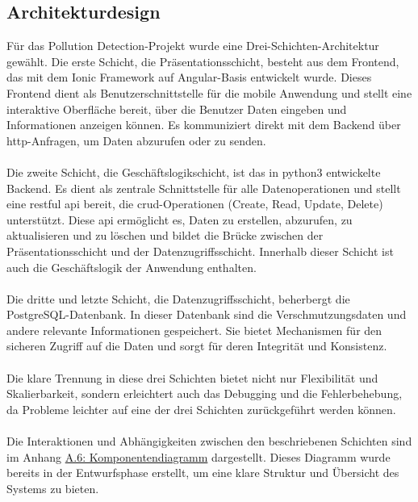\documentclass[a4paper,12pt]{article}
\begin{document}
\subsection{Architekturdesign}
\label{sec:architekturdesign}
Für das \glqq Pollution Detection\grqq{}-Projekt wurde eine Drei-Schichten-Architektur gewählt. Die erste Schicht, die Präsentationsschicht, besteht aus dem Frontend, das mit dem Ionic Framework auf Angular-Basis entwickelt wurde. Dieses Frontend dient als Benutzerschnittstelle für die mobile Anwendung und stellt eine interaktive Oberfläche bereit, über die Benutzer Daten eingeben und Informationen anzeigen können. Es kommuniziert direkt mit dem Backend über \acrshort{http}-Anfragen, um Daten abzurufen oder zu senden.\\
\\
Die zweite Schicht, die Geschäftslogikschicht, ist das in \acrshort{python3} entwickelte Backend. Es dient als zentrale Schnittstelle für alle Datenoperationen und stellt eine \acrshort{restful} \acrshort{api} bereit, die \acrshort{crud}-Operationen (Create, Read, Update, Delete) unterstützt. Diese \acrshort{api} ermöglicht es, Daten zu erstellen, abzurufen, zu aktualisieren und zu löschen und bildet die Brücke zwischen der Präsentationsschicht und der Datenzugriffsschicht. Innerhalb dieser Schicht ist auch die Geschäftslogik der Anwendung enthalten.\\
\\
Die dritte und letzte Schicht, die Datenzugriffsschicht, beherbergt die PostgreSQL-Daten\-bank. In dieser Datenbank sind die Verschmutzungsdaten und andere relevante Informationen gespeichert. Sie bietet Mechanismen für den sicheren Zugriff auf die Daten und sorgt für deren Integrität und Konsistenz.\\
\\
Die klare Trennung in diese drei Schichten bietet nicht nur Flexibilität und Skalierbarkeit, sondern erleichtert auch das Debugging und die Fehlerbehebung, da Probleme leichter auf eine der drei Schichten zurückgeführt werden können.\\
\\
Die Interaktionen und Abhängigkeiten zwischen den beschriebenen Schichten sind im Anhang \hyperref[sec:komponentendiagramm]{A.6: Komponentendiagramm} dargestellt. Dieses Diagramm wurde bereits in der Entwurfsphase erstellt, um eine klare Struktur und Übersicht des Systems zu bieten.
\end{document}

